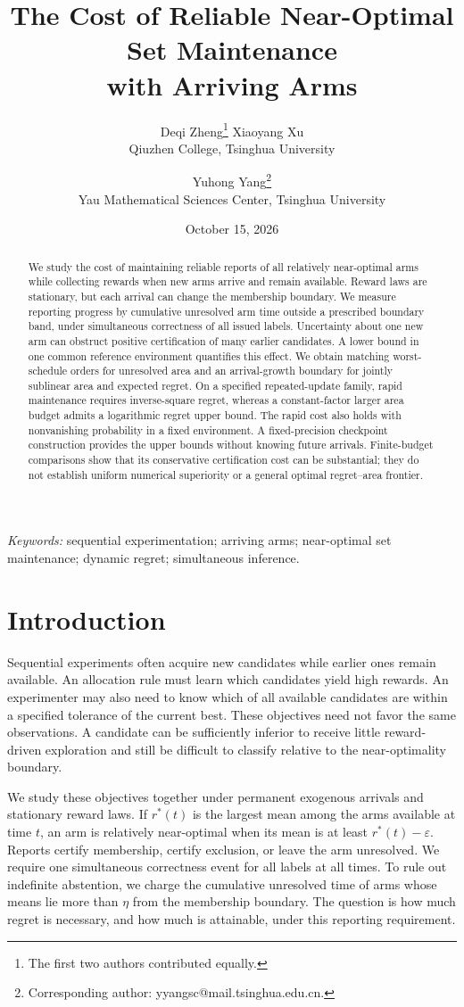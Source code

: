 \documentclass[11pt]{article}
\title{The Cost of Reliable Near-Optimal Set Maintenance\\with Arriving Arms}
\author{}
\author{Deqi Zheng\thanks{The first two authors contributed equally.} \quad
 Xiaoyang Xu\footnotemark[1] \\ Qiuzhen College, Tsinghua University
 \and Yuhong Yang\thanks{Corresponding author: yyangsc@mail.tsinghua.edu.cn.}\\
 Yau Mathematical Sciences Center, Tsinghua University}
\date{October 15, 2026}
\theoremstyle{remark}
\begin{document}
\maketitle

\begin{abstract}
We study the cost of maintaining reliable reports of all relatively
near-optimal arms while collecting rewards when new arms arrive and remain
available. Reward laws are stationary, but each arrival can change the
membership boundary. We measure reporting progress by cumulative unresolved
arm time outside a prescribed boundary band, under simultaneous correctness
of all issued labels. Uncertainty about one new arm can obstruct positive
certification of many earlier candidates. A lower bound in one common
reference environment quantifies this effect. We obtain matching
worst-schedule orders for unresolved area and an arrival-growth boundary
for jointly sublinear area and expected regret. On a specified
repeated-update family, rapid maintenance requires inverse-square regret,
whereas a constant-factor larger area budget admits a logarithmic regret
upper bound. The rapid cost also holds with nonvanishing probability in a
fixed environment. A fixed-precision checkpoint construction provides the
upper bounds without knowing future arrivals. Finite-budget comparisons
show that its conservative certification cost can be substantial; they
do not establish uniform numerical superiority or a general optimal
regret--area frontier.
\end{abstract}
\noindent\textit{Keywords:} sequential experimentation; arriving arms;
near-optimal set maintenance; dynamic regret; simultaneous inference.

\section{Introduction}
\label{sec:introduction}

Sequential experiments often acquire new candidates while earlier ones remain
available. An allocation rule must learn which candidates yield high rewards.
An experimenter may also need to know which of all available candidates are
within a specified tolerance of the current best. These objectives need not
favor the same observations. A candidate can be sufficiently inferior to
receive little reward-driven exploration and still be difficult to classify
relative to the near-optimality boundary.

We study these objectives together under permanent exogenous arrivals and
stationary reward laws. If $r^*(t)$ is the largest mean among the arms
available at time $t$, an arm is relatively near-optimal when its mean is at
least $r^*(t)-\varepsilon$. Reports certify membership, certify exclusion, or
leave the arm unresolved. We require one simultaneous correctness event for
all labels at all times. To rule out indefinite abstention, we charge the
cumulative unresolved time of arms whose means lie more than $\eta$ from
the membership boundary. The question is how much regret is necessary, and
how much is attainable, under this reporting requirement.
\end{document}
